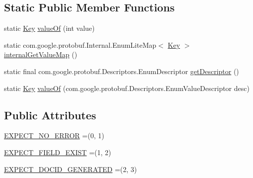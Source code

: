 \subsection*{Static Public Member Functions}
\begin{DoxyCompactItemize}
\item 
static \mbox{\hyperlink{enumcom_1_1mysql_1_1cj_1_1x_1_1protobuf_1_1_mysqlx_expect_1_1_open_1_1_condition_1_1_key}{Key}} \mbox{\hyperlink{enumcom_1_1mysql_1_1cj_1_1x_1_1protobuf_1_1_mysqlx_expect_1_1_open_1_1_condition_1_1_key_a077b6dccafe1e79d2a697b692ea81e5b}{value\+Of}} (int value)
\item 
static com.\+google.\+protobuf.\+Internal.\+Enum\+Lite\+Map$<$ \mbox{\hyperlink{enumcom_1_1mysql_1_1cj_1_1x_1_1protobuf_1_1_mysqlx_expect_1_1_open_1_1_condition_1_1_key}{Key}} $>$ \mbox{\hyperlink{enumcom_1_1mysql_1_1cj_1_1x_1_1protobuf_1_1_mysqlx_expect_1_1_open_1_1_condition_1_1_key_a7baaf42be9b8b86f5b27d80a783be367}{internal\+Get\+Value\+Map}} ()
\item 
static final com.\+google.\+protobuf.\+Descriptors.\+Enum\+Descriptor \mbox{\hyperlink{enumcom_1_1mysql_1_1cj_1_1x_1_1protobuf_1_1_mysqlx_expect_1_1_open_1_1_condition_1_1_key_abeb7c87620f891c1ff72be98727123d1}{get\+Descriptor}} ()
\item 
static \mbox{\hyperlink{enumcom_1_1mysql_1_1cj_1_1x_1_1protobuf_1_1_mysqlx_expect_1_1_open_1_1_condition_1_1_key}{Key}} \mbox{\hyperlink{enumcom_1_1mysql_1_1cj_1_1x_1_1protobuf_1_1_mysqlx_expect_1_1_open_1_1_condition_1_1_key_a1452c1e93f2700ef026aa4b00a519e54}{value\+Of}} (com.\+google.\+protobuf.\+Descriptors.\+Enum\+Value\+Descriptor desc)
\end{DoxyCompactItemize}
\subsection*{Public Attributes}
\begin{DoxyCompactItemize}
\item 
\mbox{\hyperlink{enumcom_1_1mysql_1_1cj_1_1x_1_1protobuf_1_1_mysqlx_expect_1_1_open_1_1_condition_1_1_key_a42587c5013c4efdf8f856081a4457641}{E\+X\+P\+E\+C\+T\+\_\+\+N\+O\+\_\+\+E\+R\+R\+OR}} =(0, 1)
\item 
\mbox{\hyperlink{enumcom_1_1mysql_1_1cj_1_1x_1_1protobuf_1_1_mysqlx_expect_1_1_open_1_1_condition_1_1_key_aca67f6b924f6155fc47aa09080ad713e}{E\+X\+P\+E\+C\+T\+\_\+\+F\+I\+E\+L\+D\+\_\+\+E\+X\+I\+ST}} =(1, 2)
\item 
\mbox{\hyperlink{enumcom_1_1mysql_1_1cj_1_1x_1_1protobuf_1_1_mysqlx_expect_1_1_open_1_1_condition_1_1_key_a7303a6a5175d8fe5cbfe4e20b1ddcb44}{E\+X\+P\+E\+C\+T\+\_\+\+D\+O\+C\+I\+D\+\_\+\+G\+E\+N\+E\+R\+A\+T\+ED}} =(2, 3)
\end{DoxyCompactItemize}
